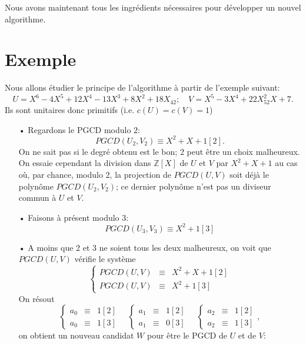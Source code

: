\documentclass[10pt,a4paper]{report}
\begin{document}
Nous avons maintenant tous les ingrédients nécessaires pour développer un nouvel algorithme.


\section*{Exemple}

Nous allons étudier le principe de l'algorithme à partir de l'exemple suivant:
$$    U=X^6-4X^5 +12X^4  -13 X^3 +8X^2  +18 X _42; \quad  V= X^5 -3X^4  +22 X^2 _52 X +7  . $$
Ils sont unitaires donc primitifs (i.e. $c(U)=c(V)=1$)



\begin{itemize}
\item[•] Regardons le PGCD modulo $2$: 
$$   PGCD(U_2,V_2) \equiv X^2+X+1 [2]  .    $$
On ne sait pas si le degré obtenu est le bon; 2 peut être un choix malheureux. On essaie cependant la division dans $\mathbb{Z}[X]$ de $U$ et $V$ par $X^2+X+1$ au cas où, par chance, modulo 2, la projection de $PGCD(U,V)$ soit déjà le polynôme $PGCD(U_2,V_2)$; ce dernier polynôme n'est pas un diviseur commun à $U$ et $V$.
\item[•] Faisons à présent modulo $3$:
$$    PGCD(U_3,V_3) \equiv X^2+1 [3]      $$
\item[•] A moins que 2 et 3 ne soient tous les deux malheureux, on voit que $PGCD(U,V)$ vérifie le système
$$      \left \{     \begin{array}{ccc}
PGCD(U,V) & \equiv  & X^2 +X+1 [2] \\
PGCD(U,V) & \equiv & X^2+1 [3]
\end{array}     \right.     $$
On résout
\begin{equation*}      \left \{     \begin{array}{ccc}
a_0 & \equiv  & 1 [2] \\
a_0 & \equiv &1 [3]
\end{array}     \right.  \quad         \left \{     \begin{array}{ccc}
a_1 & \equiv  & 1 [2] \\
a_1 & \equiv &0 [3]
\end{array}     \right.    \quad
    \left \{     \begin{array}{ccc}
a_2 & \equiv  & 1 [2] \\
a_2 & \equiv &1 [3]
\end{array}     \right. ,  
  \end{equation*}
on obtient un nouveau candidat $W$ pour être le PGCD de $U$ et de $V$:

\end{itemize}
\end{document}
